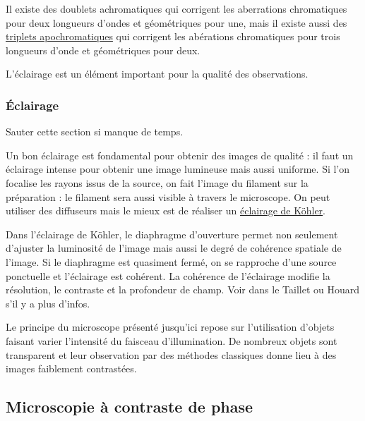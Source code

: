 \begin{remarque}
Il existe des doublets achromatiques qui corrigent les aberrations chromatiques pour deux longueurs d'ondes et géométriques pour une, mais il existe aussi des \href{https://fr.wikipedia.org/wiki/Triplet_apochromatique}{triplets apochromatiques} qui corrigent les abérations chromatiques pour trois longueurs d'onde et géométriques pour deux.
\end{remarque}

\begin{transition}
L'éclairage est un élément important pour la qualité des observations.
\end{transition}

\subsubsection{Éclairage}

Sauter cette section si manque de temps.

Un bon éclairage est fondamental pour obtenir des images de qualité : il faut un éclairage intense pour obtenir une image lumineuse mais aussi uniforme.
Si l'on focalise les rayons issus de la source, on fait l'image du filament sur la préparation : le filament sera aussi visible à travers le microscope.
On peut utiliser des diffuseurs mais le mieux est de réaliser un \href{http://www.optique-ingenieur.org/fr/cours/OPI_fr_M03_C03/co/Contenu_03.html}{éclairage de Köhler}.

\begin{remarque}
Dans l'éclairage de Köhler, le diaphragme d'ouverture permet non seulement d'ajuster la luminosité de l'image mais aussi le degré de cohérence spatiale de l'image.
Si le diaphragme est quasiment fermé, on se rapproche d'une source ponctuelle et l'éclairage est cohérent.
La cohérence de l'éclairage modifie la résolution, le contraste et la profondeur de champ.
Voir dans le Taillet ou Houard s'il y a plus d'infos. 
\end{remarque}

\begin{transition}
Le principe du microscope présenté jusqu'ici repose sur l'utilisation d'objets faisant varier l'intensité du faisceau d'illumination.
De nombreux objets sont transparent et leur observation par des méthodes classiques donne lieu à des images faiblement contrastées.
\end{transition}

\subsection{Microscopie à contraste de phase}

